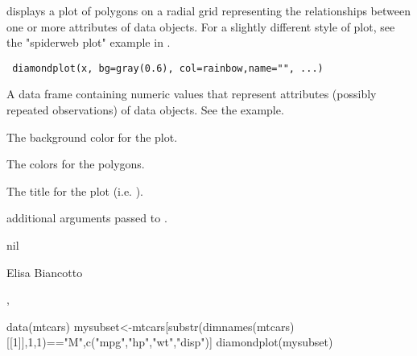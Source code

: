 \begin{Description}\relax
{} displays a plot of polygons on a radial grid representing
the relationships between one or more attributes of data objects. For a slightly
different style of plot, see the "spiderweb plot" example in .
\end{Description}
\begin{Usage}
\begin{verbatim}
 diamondplot(x, bg=gray(0.6), col=rainbow,name="", ...)
\end{verbatim}
\end{Usage}
\begin{Arguments}
\begin{ldescription}
\item[\code{x}] A data frame containing numeric values that represent attributes
(possibly repeated observations) of data objects. See the example.
\item[\code{bg}] The background color for the plot.
\item[\code{col}] The colors for the polygons.
\item[\code{name}] The title for the plot (i.e. ).
\item[\code{...}] additional arguments passed to .
\end{ldescription}
\end{Arguments}
\begin{Value}
nil
\end{Value}
\begin{Author}\relax
Elisa Biancotto
\end{Author}
\begin{SeeAlso}\relax
{}, 
\end{SeeAlso}
\begin{Examples}
\begin{ExampleCode}
 data(mtcars)
 mysubset<-mtcars[substr(dimnames(mtcars)[[1]],1,1)=="M",c("mpg","hp","wt","disp")]
 diamondplot(mysubset)
\end{ExampleCode}
\end{Examples}

